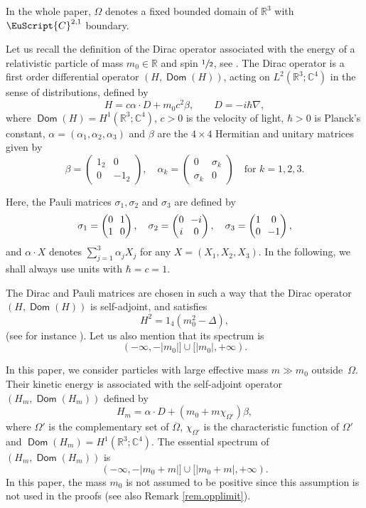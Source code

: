\documentclass[10pt]{amsart}
\let\mathcal \EuScript
\newcommand{\cC}{\mathcal{C}}
\theoremstyle{plain}
\theoremstyle{definition}
\newcommand{\RR}{\mathbb{R}}
\newcommand{\CC}{\mathbb{C}}
\DeclareMathOperator{\Dom}{\mathsf{Dom}}
\begin{document}
In the whole paper, $\Omega$ deno\-tes a fixed bounded domain of $\RR^3$ with $\cC^{2,1}$ boundary.

Let us recall the definition of the Dirac operator associated with the energy of a relativistic particle of mass $m_0\in \RR$ and spin $\sfrac{1}{2}$, see \cite{Thaller1992}. The Dirac operator is a first order differential operator $(H,\Dom(H))$, acting on $L^2(\RR^3;\mathbb{C}^4)$ in the sense of distributions, defined by
\begin{equation}
H=c\alpha\cdot D+m_0c^2\beta,\qquad D=-i\hbar\nabla,
\end{equation}
where $\Dom(H) = H^1(\RR^3; \CC^4)$, $c>0$ is the velocity of light, $\hbar>0$ is Planck's constant, $\alpha=(\alpha_1,\alpha_2,\alpha_3)$ and $\beta$
are the $4\times4$ Hermitian and unitary matrices given by
\[
\beta=\begin{pmatrix}1_2&0\\0&-1_2\end{pmatrix},\quad
\alpha_k=\begin{pmatrix}0&\sigma_k\\\sigma_k&0\end{pmatrix}\quad\mbox{for }k=1,2,3.
\]

Here, the Pauli matrices $\sigma_1,\sigma_2$ and $\sigma_3$ are defined by
\[\arraycolsep3.5pt
\sigma_1 = \begin{pmatrix}
0&1\\1&0
\end{pmatrix},
\quad
\sigma_2 = \begin{pmatrix}0&-i\\i&0
\end{pmatrix},
\quad
\sigma_3 = \begin{pmatrix}
1&0\\0&-1
\end{pmatrix},
\]
and $\alpha \cdot X$ denotes $\sum_{j=1}^3\alpha_j X_j$ for any $X = (X_1,X_2,X_3)$.
In the following, we shall always use units with $\hbar=c=1$.

The Dirac and Pauli matrices are chosen in such a way that the Dirac operator $(H,\Dom(H))$ is self-adjoint, and satisfies
\[
H^2 = 1_4(m_0^2-\Delta),
\]
(see for instance \cite[\S 1.1]{Thaller1992}).
Let us also mention that its spectrum is
\[(-\infty,-|m_0|]\cup[|m_0|,+\infty).\]

In this paper, we consider particles with large effective mass $m\gg m_0$ outside~$\Omega$. Their kinetic energy is associated with the self-adjoint operator $(H_m, \Dom(H_m))$ \hbox{defined} by
\[
H_{m}=\alpha\cdot D+(m_0 + m\chi_{\Omega'})\beta,
\]
where $\Omega'$ is the complementary set of $\overline{\Omega}$, $\chi_{\Omega'}$ is the characteristic function of $\Omega'$ and $\Dom(H_m) = H^1(\RR^3;\CC^4)$.
The essential spectrum of $(H_m, \Dom(H_m))$ is
\[
(-\infty,-|m_0 + m|]\cup[|m_0 + m|,+\infty).
\]
In this paper, the mass $m_0$ is not assumed to be positive since this assumption is not used in the proofs (see also Remark \ref{rem.opplimit}).
\end{document}
